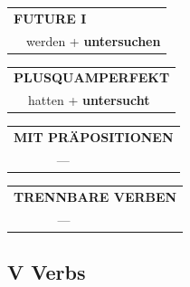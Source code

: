 \documentclass[10pt,a4paper]{revtex4-2}
\begin{document}
\begin{verbbox}
\begin{tabular}{rl}
    \multicolumn{2}{l}{\textbf{FUTURE I} }\\
   & werden + \textbf{untersuchen}\\
 
  \end{tabular}
\hfill
   \begin{tabular}{rl}
      \multicolumn{2}{l}{\textbf{PLUSQUAMPERFEKT}}\\
   & hatten + \textbf{untersucht}\\
  \end{tabular}
  
  \vspace{10pt}



\begin{tabular}{lll}
\multicolumn{3}{l}{\textbf{MIT PRÄPOSITIONEN}}\\
& ---\\
\end{tabular}
\hfill
\begin{tabular}{lll}
\multicolumn{3}{l}{\textbf{TRENNBARE VERBEN}}\\
& ---\\
\end{tabular}

  \vspace{-5pt}

\end{verbbox}

\subsection{V Verbs}
\end{document}
